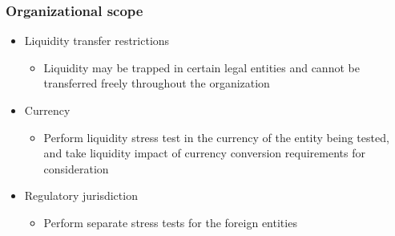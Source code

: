 \subsubsection{Organizational scope}
\begin{itemize}
\item Liquidity transfer restrictions
    \begin{itemize}
    \item Liquidity may be trapped in certain legal entities and cannot be transferred freely throughout the organization
    \end{itemize}
\item Currency
    \begin{itemize}
    \item Perform liquidity stress test in the currency of the entity being tested, and take liquidity impact of currency conversion requirements for consideration
    \end{itemize}
\item Regulatory jurisdiction
    \begin{itemize}
    \item Perform separate stress tests for the foreign entities
    \end{itemize}
    
\end{itemize}



